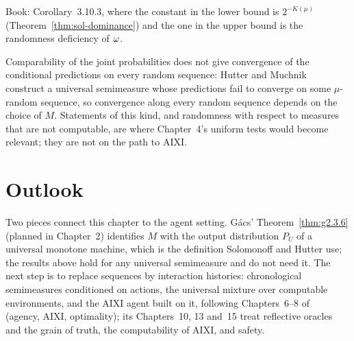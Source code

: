 \begin{formalization}
Book: Corollary~3.10.3, where the constant in the lower bound is \( 2^{-K(\mu)} \)
(Theorem~\ref{thm:sol-dominance}) and the one in the upper bound is the randomness
deficiency of \( \omega \).
\end{formalization}

\begin{remark}
Comparability of the joint probabilities does not give convergence of the conditional
predictions on every random sequence: Hutter and Muchnik~\cite{HutterMuchnik07} construct
a universal semimeasure whose predictions fail to converge on some \( \mu \)-random
sequence, so convergence along every random sequence depends on the choice of \( M \).
Statements of this kind, and randomness with respect to measures that are not computable,
are where Chapter~4's uniform tests would become relevant; they are not on the path to
AIXI.
\end{remark}

\section{Outlook}

Two pieces connect this chapter to the agent setting. G\'acs' Theorem~\ref{thm:g2.3.6}
(planned in Chapter~2) identifies \( M \) with the output distribution \( P_{U} \) of a
universal monotone machine, which is the definition Solomonoff and Hutter use; the results
above hold for any universal semimeasure and do not need it. The next step is to replace
sequences by interaction histories: chronological semimeasures conditioned on actions,
the universal mixture over computable environments, and the AIXI agent built on it,
following Chapters~6--8 of~\cite{HutterQuarelCatt24} (agency, AIXI, optimality); its
Chapters~10, 13 and~15 treat reflective oracles and the grain of truth, the
computability of AIXI, and safety.
